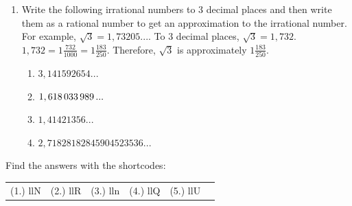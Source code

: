 \begin{enumerate}[noitemsep, label=\textbf{\arabic*}. ]
        \label{m38349*uid44}\item Write the following irrational numbers to 3 decimal places and then write them as a rational number to get an approximation to the irrational number. For example, \begin{math}\sqrt{3}=1,73205...\end{math}. To 3 decimal places, \begin{math}\sqrt{3}=1,732\end{math}. \begin{math}1,732=1\frac{732}{1000}=1\frac{183}{250}\end{math}. Therefore, \begin{math}\sqrt{3}\end{math} is approximately \begin{math}1\frac{183}{250}\end{math}.
\label{m38349*id326443}\begin{enumerate}[noitemsep, label=\textbf{\alph*}. ] 
            \label{m38349*uid45}\item \begin{math}3,141592654...\end{math}\label{m38349*uid46}\item \begin{math}1,618\phantom{\rule{0.166667em}{0ex}}033\phantom{\rule{0.166667em}{0ex}}989\phantom{\rule{0.166667em}{0ex}}...\end{math}\label{m38349*uid47}\item \begin{math}1,41421356...\end{math}\label{m38349*uid48}\item \begin{math}2,71828182845904523536...\end{math}\end{enumerate}
        
        \end{enumerate}
        
    
  \label{m38349**end}
    
\par {} Find the answers with the shortcodes:
 \par \begin{tabular}[h]{cccccc}
 (1.) llN  &  (2.) llR  &  (3.) lln  &  (4.) llQ  &  (5.) llU  & \end{tabular}




